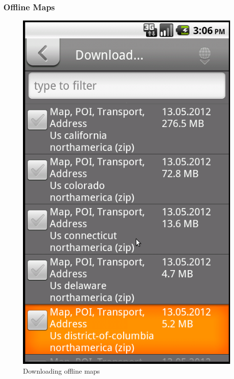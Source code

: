 \documentclass[a4paper,12pt, notitlepage, oneside, onecolumn]{article}
\begin{document}
\subsubsection{Offline Maps}

\begin{figure}[ht]
\begin{minipage}[b]{0.5\linewidth}
\centering
\includegraphics[scale=0.3]{offline_map_section.png}
\caption{Downloading offline maps}
\label{fig:offline_map_section}
\end{minipage}
\begin{minipage}[b]{0.5\linewidth}
\centering

\end{minipage}
\end{figure}
\end{document}

